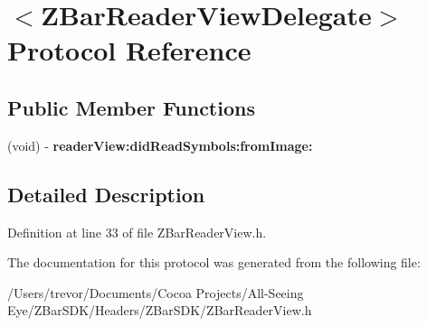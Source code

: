 \hypertarget{protocol_z_bar_reader_view_delegate-p}{
\section{$<$ZBarReaderViewDelegate$>$ Protocol Reference}
\label{protocol_z_bar_reader_view_delegate-p}
}
\subsection*{Public Member Functions}
\begin{DoxyCompactItemize}
\item 
\hypertarget{protocol_z_bar_reader_view_delegate-p_afa974d1a1ee1ec6027e94cbb2749f455}{
(void) -\/ {\bfseries readerView:didReadSymbols:fromImage:}}
\label{protocol_z_bar_reader_view_delegate-p_afa974d1a1ee1ec6027e94cbb2749f455}

\end{DoxyCompactItemize}


\subsection{Detailed Description}


Definition at line 33 of file ZBarReaderView.h.



The documentation for this protocol was generated from the following file:\begin{DoxyCompactItemize}
\item 
/Users/trevor/Documents/Cocoa Projects/All-\/Seeing Eye/ZBarSDK/Headers/ZBarSDK/ZBarReaderView.h\end{DoxyCompactItemize}
